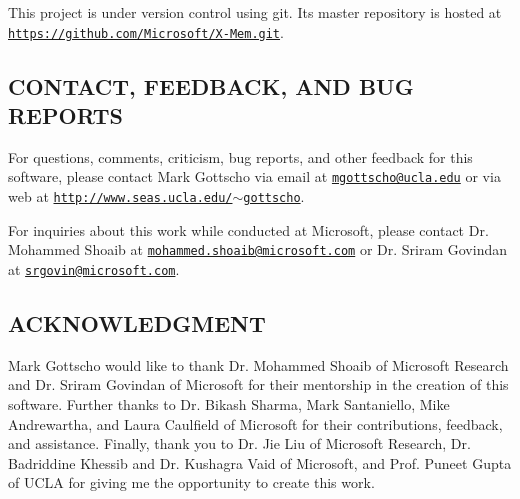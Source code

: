 This project is under version control using git. Its master repository is hosted at \href{https://github.com/Microsoft/X-Mem.git}{\tt https\-://github.\-com/\-Microsoft/\-X-\/\-Mem.\-git}. 

 \subsection*{C\-O\-N\-T\-A\-C\-T, F\-E\-E\-D\-B\-A\-C\-K, A\-N\-D B\-U\-G R\-E\-P\-O\-R\-T\-S }

For questions, comments, criticism, bug reports, and other feedback for this software, please contact Mark Gottscho via email at \href{mailto:mgottscho@ucla.edu}{\tt mgottscho@ucla.\-edu} or via web at \href{http://www.seas.ucla.edu/~gottscho}{\tt http\-://www.\-seas.\-ucla.\-edu/$\sim$gottscho}.

For inquiries about this work while conducted at Microsoft, please contact Dr. Mohammed Shoaib at \href{mailto:mohammed.shoaib@microsoft.com}{\tt mohammed.\-shoaib@microsoft.\-com} or Dr. Sriram Govindan at \href{mailto:srgovin@microsoft.com}{\tt srgovin@microsoft.\-com}. 

 \subsection*{A\-C\-K\-N\-O\-W\-L\-E\-D\-G\-M\-E\-N\-T }

Mark Gottscho would like to thank Dr. Mohammed Shoaib of Microsoft Research and Dr. Sriram Govindan of Microsoft for their mentorship in the creation of this software. Further thanks to Dr. Bikash Sharma, Mark Santaniello, Mike Andrewartha, and Laura Caulfield of Microsoft for their contributions, feedback, and assistance. Finally, thank you to Dr. Jie Liu of Microsoft Research, Dr. Badriddine Khessib and Dr. Kushagra Vaid of Microsoft, and Prof. Puneet Gupta of U\-C\-L\-A for giving me the opportunity to create this work. 